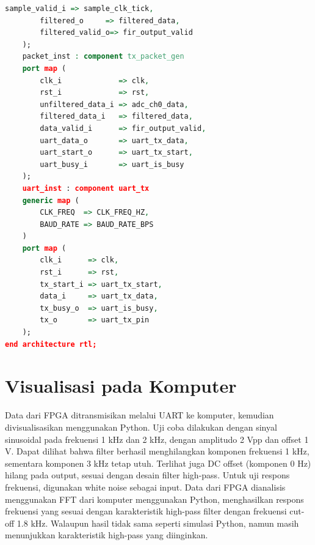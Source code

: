 \documentclass[a4paper,12pt]{article}
\begin{document}
\begin{lstlisting}[language=VHDL, basicstyle=\tiny, lineskip=0em,belowskip=0em,aboveskip=0em, frame=single]
        sample_valid_i => sample_clk_tick,
        filtered_o     => filtered_data,
        filtered_valid_o=> fir_output_valid
    );
    packet_inst : component tx_packet_gen
    port map (
        clk_i             => clk,
        rst_i             => rst,
        unfiltered_data_i => adc_ch0_data,
        filtered_data_i   => filtered_data,
        data_valid_i      => fir_output_valid,
        uart_data_o       => uart_tx_data,
        uart_start_o      => uart_tx_start,
        uart_busy_i       => uart_is_busy
    );
    uart_inst : component uart_tx
    generic map (
        CLK_FREQ  => CLK_FREQ_HZ,
        BAUD_RATE => BAUD_RATE_BPS
    )
    port map (
        clk_i      => clk,
        rst_i      => rst,
        tx_start_i => uart_tx_start,
        data_i     => uart_tx_data,
        tx_busy_o  => uart_is_busy,
        tx_o       => uart_tx_pin
    );
end architecture rtl;
\end{lstlisting}
\vspace{-1.5em}
\begin{center}
\end{center}
\vspace{-1.5em}

\section{Visualisasi pada Komputer}

Data dari FPGA ditransmisikan melalui UART ke komputer, kemudian divisualisasikan menggunakan Python.
Uji coba dilakukan dengan sinyal sinusoidal pada frekuensi 1 kHz dan 2 kHz, dengan amplitudo 2 Vpp dan offset 1 V.
Dapat dilihat bahwa filter berhasil menghilangkan komponen frekuensi 1 kHz, sementara komponen 3 kHz tetap utuh.
Terlihat juga DC offset (komponen 0 Hz) hilang pada output, sesuai dengan desain filter high-pass.
Untuk uji respons frekuensi, digunakan white noise sebagai input. Data dari FPGA dianalisis menggunakan FFT dari komputer
menggunakan Python, menghasilkan respons frekuensi yang sesuai dengan karakteristik high-pass filter dengan frekuensi cut-off 1.8 kHz.
Walaupun hasil tidak sama seperti simulasi Python, namun masih menunjukkan karakteristik high-pass yang diinginkan.
\end{document}
